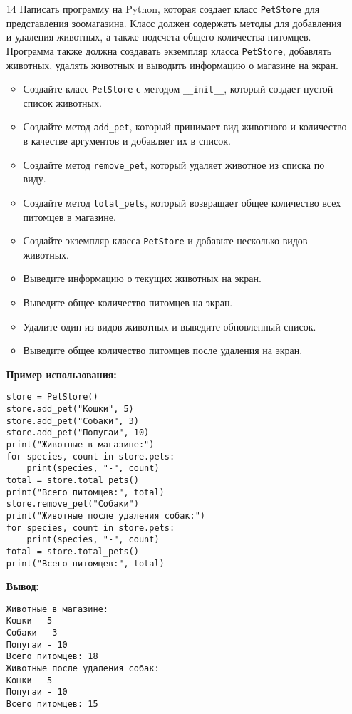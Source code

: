 \begin{enumerate}
\item[14] Написать программу на Python, которая создает класс \texttt{PetStore} для представления зоомагазина. Класс должен содержать методы для добавления и удаления животных, а также подсчета общего количества питомцев. Программа также должна создавать экземпляр класса \texttt{PetStore}, добавлять животных, удалять животных и выводить информацию о магазине на экран.

\begin{itemize}
    \item Создайте класс \texttt{PetStore} с методом \texttt{\_\_init\_\_}, который создает пустой список животных.
    \item Создайте метод \texttt{add\_pet}, который принимает вид животного и количество в качестве аргументов и добавляет их в список.
    \item Создайте метод \texttt{remove\_pet}, который удаляет животное из списка по виду.
    \item Создайте метод \texttt{total\_pets}, который возвращает общее количество всех питомцев в магазине.
    \item Создайте экземпляр класса \texttt{PetStore} и добавьте несколько видов животных.
    \item Выведите информацию о текущих животных на экран.
    \item Выведите общее количество питомцев на экран.
    \item Удалите один из видов животных и выведите обновленный список.
    \item Выведите общее количество питомцев после удаления на экран.
\end{itemize}

\textbf{Пример использования:}

\begin{verbatim}
store = PetStore()
store.add_pet("Кошки", 5)
store.add_pet("Собаки", 3)
store.add_pet("Попугаи", 10)
print("Животные в магазине:")
for species, count in store.pets:
    print(species, "-", count)
total = store.total_pets()
print("Всего питомцев:", total)
store.remove_pet("Собаки")
print("Животные после удаления собак:")
for species, count in store.pets:
    print(species, "-", count)
total = store.total_pets()
print("Всего питомцев:", total)
\end{verbatim}

\textbf{Вывод:}
\begin{verbatim}
Животные в магазине:
Кошки - 5
Собаки - 3
Попугаи - 10
Всего питомцев: 18
Животные после удаления собак:
Кошки - 5
Попугаи - 10
Всего питомцев: 15
\end{verbatim}


\end{enumerate}
